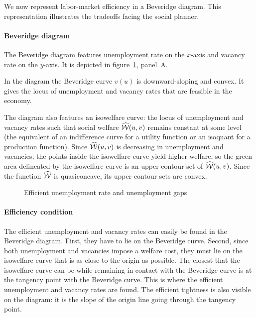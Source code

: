 \documentclass[letterpaper,12pt,leqno]{article}
\def\pdf{../../figures/xhosios_202103.pdf}
\def\W{\wh{\Wc}}
\begin{document}
We now represent labor-market efficiency in a Beveridge diagram. This representation illustrates the tradeoffs facing the social planner.

\paragraph{Beveridge diagram} The Beveridge diagram features unemployment rate on the $x$-axis and vacancy rate on the $y$-axis. It is depicted in figure~\ref{f:theory}, panel~A.

In the diagram the Beveridge curve $v(u)$ is downward-sloping and convex. It gives the locus of unemployment and vacancy rates that are feasible in the economy. 

The diagram also features an isowelfare curve: the locus of unemployment and vacancy rates such that social welfare $\W(u,v)$ remains constant at some level (the equivalent of an indifference curve for a utility function or an isoquant for a production function). Since $\W(u,v)$ is decreasing in unemployment and vacancies, the points inside the isowelfare curve yield higher welfare, so the green area delineated by the isowelfare curve is an upper contour set of $\W(u,v)$. Since the function $\W$ is quasiconcave, its upper contour sets are convex.

\begin{figure}[t]
\hfill
{}
\caption{Efficient unemployment rate and unemployment gaps}
\label{f:theory}\end{figure}

\paragraph{Efficiency condition} The efficient unemployment and vacancy rates can easily be found in the Beveridge diagram. First, they have to lie on the Beveridge curve. Second, since both unemployment and vacancies impose a welfare cost, they must lie on the isowelfare curve that is as close to the origin as possible. The closest that the isowelfare curve can be while remaining in contact with the Beveridge curve is at the tangency point with the Beveridge curve. This is where the efficient unemployment and vacancy rates are found. The efficient tightness is also visible on the diagram: it is the slope of the origin line going through the tangency point.
\end{document}
